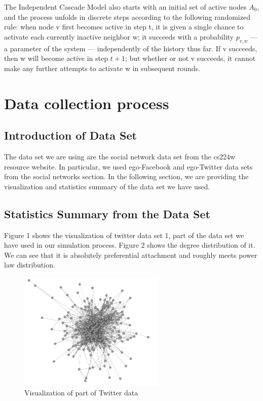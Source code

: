 \documentclass{article}
\begin{document}
The Independent Cascade Model also starts with an initial set of active nodes $A_0$, and the process unfolds in discrete steps according to the following randomized rule: when node v first becomes active in step t, it is given a single chance to activate each currently inactive neighbor w; it succeeds with a probability $p_{v,w}$ — a parameter of the system — independently of the history thus far. If v succeeds, then w will become active in step $t+1$; but whether or not v succeeds, it cannot make any further attempts to activate w in subsequent rounds.


\section{Data collection process}
\subsection{Introduction of Data Set}
The data set we are using are the social network data set from the cs224w resource website. In particular, we used ego-Facebook and ego-Twitter data sets from the social networks section. In the following section, we are providing the visualization and statistics summary of the data set we have used.

\subsection{Statistics Summary from the Data Set}
Figure 1 shows the visualization of twitter data set 1, part of the data set we have used in our simulation process. Figure 2 shows the degree distribution of it. We can see that it is absolutely preferential attachment and roughly meets power law distribution.

\begin{figure}[H]
\centering
\includegraphics[width=7cm]{graph.png}
\caption{Visualization of part of Twitter data}
\end{figure}
\end{document}
